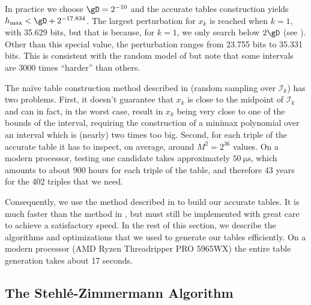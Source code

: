 \documentclass[10pt, a4paper, twoside]{basestyle}
\begin{document}
In practice we choose $\gD = 2^{-10}$ and the accurate tables construction yields $h_{\text{max}} < \gD + 2^{-17.834}$.  The largest perturbation for $x_k$ is reached when $k = 1$, with 35.629 bits, but that is because, for $k = 1$, we only search below $2 \gD$ (see ).  Other than this special value, the perturbation ranges from 23.755 bits to 35.331 bits.  This is consistent with the random model of \cite{StehléZimmermann2005} but note that some intervals are 3000 times ``harder'' than others.

The naïve table construction method described in \cite{Gal1986} (random sampling over $\mathscr{I}_k$) has two problems.  First, it doesn't guarantee that $x_k$ is close to the midpoint of $\mathscr{I}_k$ and can in fact, in the worst case, result in $x_k$ being very close to one of the bounds of the interval, requiring the construction of a minimax polynomial over an interval which is (nearly) two times too big.  Second, for each triple of the accurate table it has to inspect, on average, around $M^2 = 2^{36}$ values.  On a modern processor, testing one candidate takes approximately $\SI{50}{\micro\second}$, which amounts to about 900 hours for each triple of the table, and therefore 43 years for the 402 triples that we need.

Consequently, we use the method described in \cite{StehléZimmermann2005} to build our accurate tables.  It is much faster than the method in \cite{Gal1986}, but must still be implemented with great care to achieve a satisfactory speed.  In the rest of this section, we describe the algorithms and optimizations that we used to generate our tables efficiently.  On a modern processor (AMD Ryzen Threadripper PRO 5965WX) the entire table generation takes about 17 seconds.

\subsection*{The Stehlé-Zimmermann Algorithm}
\end{document}
